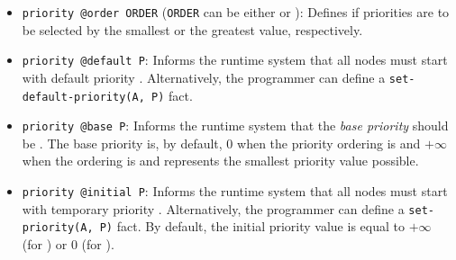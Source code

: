
\begin{itemize}

   \item \texttt{priority @order ORDER} (\texttt{ORDER} can be either 
      or ): Defines if priorities are to be selected by the smallest
      or the greatest value, respectively.

   \item \texttt{priority @default P}: Informs the runtime system that all nodes
      must start with default priority . Alternatively, the programmer can define a
      \texttt{set-default-priority(A, P)} fact.

   \item \texttt{priority @base P}: Informs the runtime system that the
      \emph{base priority} should be . The base priority is, by default,
      0 when the priority ordering is  and $+\infty$ when the ordering
      is  and represents the smallest priority value possible.

   \item \texttt{priority @initial P}: Informs the runtime system that all nodes
   must start with temporary priority . Alternatively, the programmer can define a
      \texttt{set-priority(A, P)} fact. By default, the initial priority value is equal to $+\infty$ (for ) or $0$ (for ).
      
\end{itemize}

